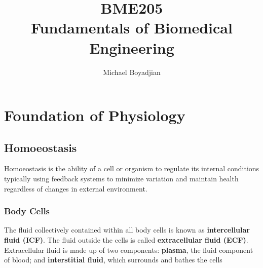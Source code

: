 \documentclass[11pt]{article}
\begin{document}
\title{BME205 \\ Fundamentals of Biomedical Engineering}
\author{Michael Boyadjian}
\maketitle
\pagebreak

\tableofcontents

\pagebreak

\bigskip
\bigskip
\bigskip

\section{Foundation of Physiology}

\subsection{Homoeostasis}
Homoeostasis is the ability of a cell or organism to regulate its internal conditions typically using feedback systems to minimize variation and maintain health regardless of changes in external environment.

\subsubsection{Body Cells}
The fluid collectively contained within all body cells is known as \textbf{intercellular fluid (ICF)}. The fluid outside the cells is called \textbf{extracellular fluid (ECF)}. Extracellular fluid is made up of two components: \textbf{plasma}, the fluid component of blood; and \textbf{interstitial fluid}, which surrounds and bathes the cells
\end{document}
